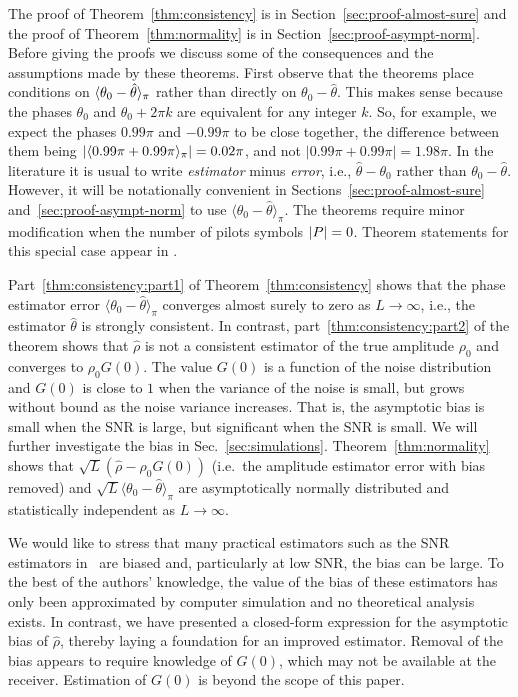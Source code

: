 \documentclass[journal]{IEEEtran}
\begin{document}
The proof of Theorem~\ref{thm:consistency} is in Section~\ref{sec:proof-almost-sure} and the proof of Theorem~\ref{thm:normality} is in Section~\ref{sec:proof-asympt-norm}. Before giving the proofs we discuss some of the consequences and the assumptions made by these theorems.  
First observe that the theorems place conditions on $\langle \theta_0 - \hat{\theta} \rangle_\pi$ rather than directly on $\theta_0 - \hat{\theta}$.  This makes sense because the phases $\theta_0$ and $\theta_0 + 2\pi k$ are equivalent for any integer $k$. So, for example, we expect the phases $0.99\pi$ and $-0.99\pi$ to be close together, the difference between them being $\vert\langle 0.99\pi + 0.99\pi \rangle_\pi\vert = 0.02\pi$, and not $\vert 0.99\pi + 0.99\pi\vert = 1.98\pi$.  In the literature it is usual to write \emph{estimator} minus \emph{error}, i.e., $\hat{\theta} - \theta_0$ rather than $\theta_0 - \hat{\theta}$.  However, it will be notationally convenient in Sections~\ref{sec:proof-almost-sure} and~\ref{sec:proof-asympt-norm} to use $\langle\theta_0 - \hat{\theta}\rangle_\pi$.  The theorems require minor modification when the number of pilots symbols ${\left\vert P \right\vert} = 0$.  Theorem statements for this special case appear in \cite{McKilliam_leastsqPSKnoncoICASSP_2012}.

Part~\ref{thm:consistency:part1} of Theorem~\ref{thm:consistency} shows that the phase estimator error $\langle\theta_0 - \hat{\theta}\rangle_\pi$ converges almost surely to zero as $L\rightarrow \infty$, i.e., the estimator $\hat{\theta}$ is strongly consistent. In contrast, part~\ref{thm:consistency:part2} of the theorem shows that $\hat{\rho}$ is not a consistent estimator of the true amplitude $\rho_0$ and converges to $\rho_0 G(0)$.  The value $G(0)$ is a function of the noise distribution and $G(0)$ is close to $1$ when the variance of the noise is small, but grows without bound as the noise variance increases.  That is, the asymptotic bias is small when the SNR is large, but significant when the SNR is small.  We will further investigate the bias in Sec.~\ref{sec:simulations}.  Theorem~\ref{thm:normality} shows that $\sqrt{L}(\hat{\rho} - \rho_0 G(0))$ (i.e.\ the amplitude estimator error with bias removed) and $\sqrt{L}\langle\theta_0 - \hat{\theta}\rangle_\pi$ are asymptotically normally distributed and statistically independent as $L\rightarrow\infty$.

We would like to stress that many practical estimators such as the SNR estimators in~\cite{Pauluzzi2000} are biased and, particularly at low SNR, the bias can be large.  To the best of the authors' knowledge, the value of the bias of these estimators has only been approximated by computer simulation and no theoretical analysis exists.  In contrast, we have presented a closed-form expression for the asymptotic bias of $\hat\rho$, thereby laying a foundation for an improved estimator.  Removal of the bias appears to require knowledge of $G(0)$, which may not be available at the receiver. Estimation of $G(0)$ is beyond the scope of this paper.
\end{document}
